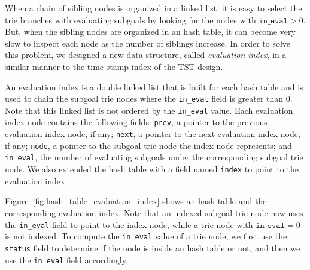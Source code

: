 When a chain of sibling nodes is organized in a linked list, it is
easy to select the trie branches with evaluating subgoals by looking
for the nodes with $\texttt{in\_eval} > 0$. But, when the sibling nodes are
organized in an hash table, it can become very slow to inspect each
node as the number of siblings increase. In order to solve this
problem, we designed a new data structure, called \textit{evaluation
index}, in a similar manner to the time stamp index of the TST design.

An evaluation index is a double linked list that is built for each
hash table and is used to chain the subgoal trie nodes where the
\texttt{in\_eval} field is greater than 0. Note that this linked list is not
ordered by the \texttt{in\_eval} value. Each evaluation index node contains
the following fields: \texttt{prev}, a pointer to the previous evaluation
index node, if any; \texttt{next}, a pointer to the next evaluation index
node, if any; \texttt{node}, a pointer to the subgoal trie node the index
node represents; and \texttt{in\_eval}, the number of evaluating subgoals
under the corresponding subgoal trie node. We also extended the hash
table with a field named \texttt{index} to point to the evaluation index.

Figure~\ref{fig:hash_table_evaluation_index} shows an hash table and
the corresponding evaluation index. Note that an indexed subgoal trie
node now uses the \texttt{in\_eval} field to point to the index node, while a
trie node with $\texttt{in\_eval} = 0$ is not indexed. To compute the
\texttt{in\_eval} value of a trie node, we first use the \texttt{status} field to
determine if the node is inside an hash table or not, and then we use the
\texttt{in\_eval} field accordingly.

